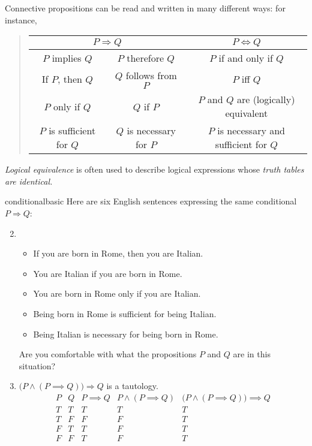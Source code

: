 Connective propositions can be read and written in many different ways: for instance,
\begin{quote}
	\def\arraystretch{1.05}
	\begin{tabular}{@{}cc|c}
		\multicolumn{2}{c|}{$P\Longrightarrow Q$} & $P\Longleftrightarrow Q$\\\hline
		$P$ implies $Q$ & $P$ therefore $Q$ & $P$ if and only if $Q$\\
		If $P$, then $Q$ & $Q$ follows from $P$ & $P$ iff $Q$\\
		$P$ only if $Q$ & $Q$ if $P$ & $P$ and $Q$ are (logically) equivalent\\
		$P$ is sufficient for $Q$ & $Q$ is necessary for $P$ & $P$ is necessary and sufficient for $Q$
	\end{tabular}
\end{quote}
\emph{Logical equivalence} is often used to describe logical expressions whose \emph{truth tables are identical.}


\goodbreak


\begin{examples}{}{conditionalbasic}
	\exstart Here are six English sentences expressing the same conditional $P\Longrightarrow Q$:\vspace{-1pt}
	\begin{enumerate}\setcounter{enumi}{1}
	\item[]\begin{itemize}\itemsep1pt
			\item If you are born in Rome, then you are Italian. 
			\item You are Italian if you are born in Rome. 
			\item You are born in Rome only if you are Italian. 
			\item Being born in Rome is sufficient for being Italian. 
			\item Being Italian is necessary for being born in Rome. 
		\end{itemize}
		Are you comfortable with what the propositions $P$ and $Q$ are in this situation?
	
		\item\label{ex:taut2} $\bigl(P\wedge(P\implies Q)\bigr)\Longrightarrow Q$ is a tautology.
		\[
			\begin{array}{cc||c|c||c}
				P & Q & P\implies Q & P\wedge(P\implies Q) & \bigl(P\wedge(P\implies Q)\bigr)\implies Q\\\hline
				T & T & T & T& T\\
				T & F & F & F& T\\
				F & T & T & F& T\\
				F & F & T & F& T
			\end{array}
		\]
	\end{enumerate}
\end{examples}



